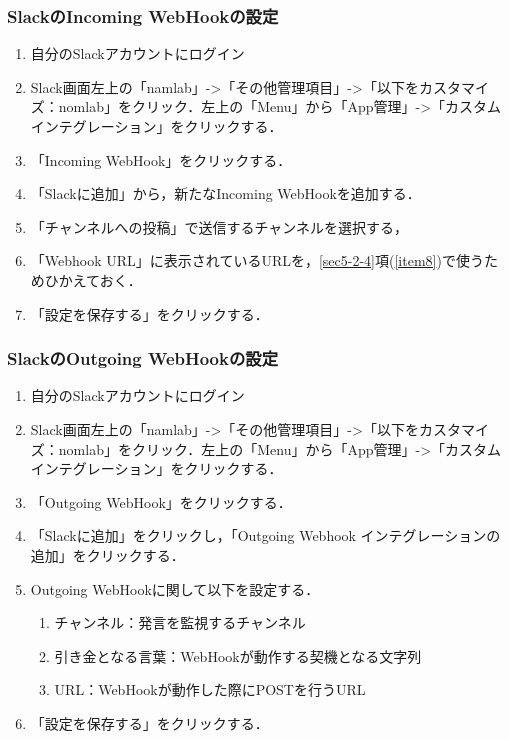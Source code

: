 \documentclass[12pt]{jsarticle}
\begin{document}
\subsubsection{SlackのIncoming WebHookの設定}\label{sec:IW}
\begin{enumerate}
\item 自分のSlackアカウントにログイン
\item Slack画面左上の「namlab」->「その他管理項目」->「以下をカスタマイズ：nomlab」をクリック．左上の「Menu」から「App管理」->「カスタムインテグレーション」をクリックする．
\item 「Incoming WebHook」をクリックする．
\item 「Slackに追加」から，新たなIncoming WebHookを追加する．
\item 「チャンネルへの投稿」で送信するチャンネルを選択する，
\item 「Webhook URL」に表示されているURLを，\ref{sec5-2-4}項(\ref{item8})で使うためひかえておく．\label{url}
\item 「設定を保存する」をクリックする．
\end{enumerate}

\subsubsection{SlackのOutgoing WebHookの設定}
\begin{enumerate}
\item 自分のSlackアカウントにログイン
\item Slack画面左上の「namlab」->「その他管理項目」->「以下をカスタマイズ：nomlab」をクリック．左上の「Menu」から「App管理」->「カスタムインテグレーション」をクリックする．
\item 「Outgoing WebHook」をクリックする．
\item 「Slackに追加」をクリックし，「Outgoing Webhook インテグレーションの追加」をクリックする．
\item Outgoing WebHookに関して以下を設定する．
  \begin{enumerate}
  \item チャンネル：発言を監視するチャンネル
  \item 引き金となる言葉：WebHookが動作する契機となる文字列
  \item URL：WebHookが動作した際にPOSTを行うURL
  \end{enumerate}
\item 「設定を保存する」をクリックする．
\end{enumerate}
\end{document}
